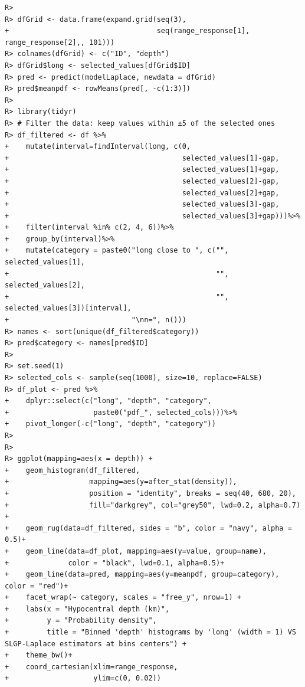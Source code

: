 \documentclass[
]{article}
\begin{document}
\begin{verbatim}
R> 
R> dfGrid <- data.frame(expand.grid(seq(3), 
+                                   seq(range_response[1], range_response[2],, 101)))
R> colnames(dfGrid) <- c("ID", "depth")
R> dfGrid$long <- selected_values[dfGrid$ID]
R> pred <- predict(modelLaplace, newdata = dfGrid)
R> pred$meanpdf <- rowMeans(pred[, -c(1:3)])
R> 
R> library(tidyr)
R> # Filter the data: keep values within ±5 of the selected ones
R> df_filtered <- df %>%
+    mutate(interval=findInterval(long, c(0, 
+                                         selected_values[1]-gap, 
+                                         selected_values[1]+gap, 
+                                         selected_values[2]-gap, 
+                                         selected_values[2]+gap, 
+                                         selected_values[3]-gap, 
+                                         selected_values[3]+gap)))%>%
+    filter(interval %in% c(2, 4, 6))%>%
+    group_by(interval)%>%
+    mutate(category = paste0("long close to ", c("", selected_values[1],
+                                                 "", selected_values[2],
+                                                 "", selected_values[3])[interval], 
+                             "\nn=", n()))
R> names <- sort(unique(df_filtered$category))
R> pred$category <- names[pred$ID]
R> 
R> set.seed(1)
R> selected_cols <- sample(seq(1000), size=10, replace=FALSE)
R> df_plot <- pred %>%
+    dplyr::select(c("long", "depth", "category", 
+                    paste0("pdf_", selected_cols)))%>%
+    pivot_longer(-c("long", "depth", "category"))
R> 
R> 
R> ggplot(mapping=aes(x = depth)) +
+    geom_histogram(df_filtered,
+                   mapping=aes(y=after_stat(density)),
+                   position = "identity", breaks = seq(40, 680, 20),
+                   fill="darkgrey", col="grey50", lwd=0.2, alpha=0.7) +
+    geom_rug(data=df_filtered, sides = "b", color = "navy", alpha = 0.5)+
+    geom_line(data=df_plot, mapping=aes(y=value, group=name), 
+              color = "black", lwd=0.1, alpha=0.5)+
+    geom_line(data=pred, mapping=aes(y=meanpdf, group=category), color = "red")+
+    facet_wrap(~ category, scales = "free_y", nrow=1) +
+    labs(x = "Hypocentral depth (km)",
+         y = "Probability density",
+         title = "Binned 'depth' histograms by 'long' (width = 1) VS SLGP-Laplace estimators at bins centers") +
+    theme_bw()+
+    coord_cartesian(xlim=range_response,
+                    ylim=c(0, 0.02))
\end{verbatim}
\end{document}
